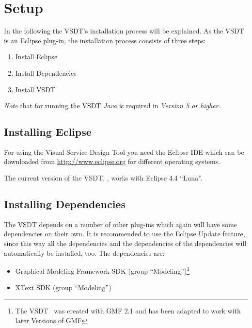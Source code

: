 \chapter{Setup}
\label{sec:user_setup}

In the following the VSDT's installation process will be explained.  As the VSDT
is an Eclipse plug-in, the installation process consists of three steps:
\begin{enumerate}
	\item Install Eclipse
	\item Install Dependencies
	\item Install VSDT
\end{enumerate}

\emph{Note} that for running the VSDT \emph{Java} is required in \emph{Version 5
or higher}.



\section{Installing Eclipse}

For using the Visual Service Design Tool you need the Eclipse IDE which can be
downloaded from \url{http://www.eclipse.org} for different operating systems.

The current version of the VSDT, \version, works with Eclipse 4.4 ``Luna''.





\section{Installing Dependencies}

The VSDT depends on a number of other plug-ins which again will have some
dependencies on their own.  It is recommended to use the Eclipse Update feature,
since this way all the dependencies and the dependencies of the dependencies
will automatically be installed, too.  The dependencies are:

\begin{itemize}
	\item Graphical Modeling Framework SDK (group ``Modeling'')\footnote{The VSDT
	\version\ was created with GMF 2.1 and has been adapted to work with later
	Versions of GMF}

	\item XText SDK (group ``Modeling'')
\end{itemize}

